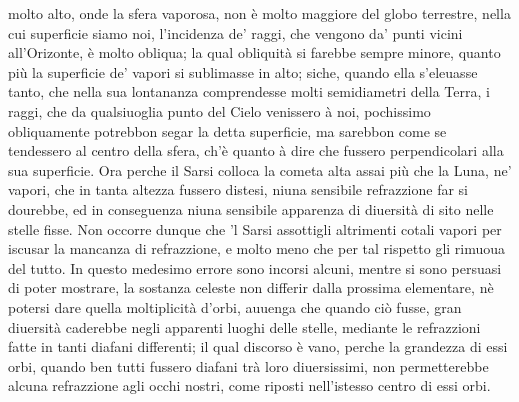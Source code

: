 \documentclass[11pt,twoside,openany]{book}
\begin{document}
molto alto, onde la sfera vaporosa, non è molto maggiore del globo terrestre, nella cui superficie siamo noi, l'incidenza de' raggi, che vengono da' punti vicini all'Orizonte, è molto obliqua; la qual obliquità si farebbe sempre minore, quanto più la superficie de' vapori si sublimasse in alto; siche, quando ella s'eleuasse tanto, che nella sua lontananza comprendesse molti semidiametri della Terra, i raggi, che da qualsiuoglia punto del Cielo venissero à noi, pochissimo obliquamente potrebbon segar la detta superficie, ma sarebbon come se tendessero al centro della sfera, ch'è quanto à dire che fussero perpendicolari alla sua superficie. Ora perche il Sarsi colloca la cometa alta assai più che la Luna, ne' vapori, che in tanta altezza fussero distesi, niuna sensibile refrazzione far si dourebbe, ed in conseguenza niuna sensibile apparenza di diuersità di sito nelle stelle fisse. Non occorre dunque che 'l Sarsi assottigli altrimenti cotali vapori per iscusar la mancanza di refrazzione, e molto meno che per tal rispetto gli rimuoua del tutto. In questo medesimo errore sono incorsi alcuni, mentre si sono persuasi di poter mostrare, la sostanza celeste non differir dalla prossima elementare, nè potersi dare quella moltiplicità d'orbi, auuenga che quando ciò fusse, gran diuersità caderebbe negli apparenti luoghi delle stelle, mediante le refrazzioni fatte in tanti diafani differenti; il qual discorso è vano, perche la grandezza di essi orbi, quando ben tutti fussero diafani trà loro diuersissimi, non permetterebbe alcuna refrazzione agli occhi nostri, come riposti nell'istesso centro di essi orbi.
\end{document}
